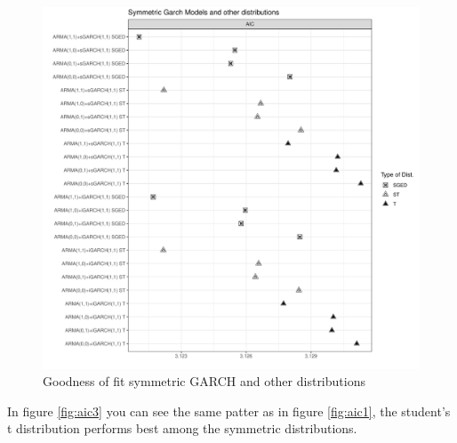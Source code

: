 \documentclass[a4paper, nobind]{templates/ociamthesis}
\begin{document}
\begin{figure}[h]

{\centering \includegraphics[width=1\linewidth]{figures/aicfigures/symmetric aics2} 

}

\caption{Goodness of fit symmetric GARCH and other distributions}\label{fig:aic2}
\end{figure}
\clearpage
\newpage

\noindent In figure \ref{fig:aic3} you can see the same patter as in figure \ref{fig:aic1}, the student's t distribution performs best among the symmetric distributions.
\end{document}
